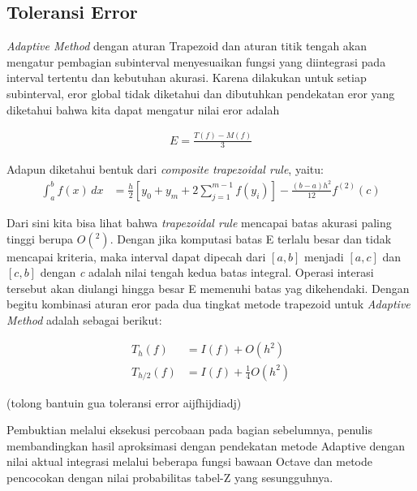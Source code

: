 \documentclass[journal,12pt,onecolumn,a4paper]{IEEEtran}
\begin{document}
\subsection{Toleransi Error}

\emph{Adaptive Method} dengan aturan Trapezoid dan aturan titik tengah akan mengatur pembagian subinterval menyesuaikan fungsi yang diintegrasi pada interval tertentu dan kebutuhan akurasi. Karena dilakukan untuk setiap subinterval, eror global tidak diketahui dan dibutuhkan pendekatan eror yang diketahui bahwa kita dapat mengatur nilai eror adalah

\begin{equation*}
	\begin{split}
		E  = \frac{T(f) - M(f)}{3}
	\end{split}
\end{equation*}

Adapun diketahui bentuk dari \emph{composite trapezoidal rule}, yaitu:
\begin{equation*}
	\begin{split}
		\int_{a}^{b} f(x) \,dx & = \frac{h}{2}[y_0+y_m+2\sum_{j=1}^{m-1}f(y_i)]-\frac{(b-a)h^2}{12}f^(2)(c)
	\end{split}
\end{equation*}

Dari sini kita bisa lihat bahwa \emph{trapezoidal rule} mencapai batas akurasi paling tinggi berupa \(O(^2)\). Dengan jika komputasi batas E terlalu besar dan tidak mencapai kriteria, maka interval dapat dipecah dari \([a,b]\) menjadi \([a,c]\) dan \([c,b]\) dengan \emph{c} adalah nilai tengah kedua batas integral.
Operasi interasi tersebut akan diulangi hingga besar E memenuhi batas yag dikehendaki.
Dengan begitu kombinasi aturan eror pada dua tingkat metode trapezoid untuk \emph{Adaptive Method} adalah sebagai berikut:

\begin{equation*}
	\begin{split}
		T_{h}(f) & = I(f) + O(h^2) \\
		T_{h/2}(f) & = I(f) + \frac{1}{4}O(h^2)
	\end{split}
\end{equation*}

(tolong bantuin gua toleransi error aijfhijdiadj)



Pembuktian melalui eksekusi percobaan pada bagian sebelumnya, penulis membandingkan hasil aproksimasi dengan pendekatan metode Adaptive dengan nilai aktual integrasi melalui beberapa fungsi bawaan Octave dan metode pencocokan dengan nilai probabilitas tabel-Z yang sesungguhnya.
\end{document}

